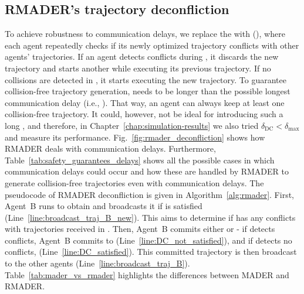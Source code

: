 \subsection{RMADER's trajectory deconfliction}

To achieve robustness to communication delays, we replace the \RecheckStep{} with \DelayCheckStep{} (\DCStep{}), where each agent repeatedly checks if its newly optimized trajectory conflicts with other agents' trajectories.
If an agent detects conflicts during \DCStep{}, it discards the new trajectory and starts another \OStep{} while executing its previous trajectory. 
If no collisions are detected in \DCStep{}, it starts executing the new trajectory. 
To guarantee collision-free trajectory generation, \DCStep{} needs to be longer than the possible longest communication delay (i.e., \NeccessaryCond{}). 
That way, an agent can always keep at least one collision-free trajectory. 
It could, however, not be ideal for introducing such a long \delayParameter{}, and therefore, in Chapter~\ref{chap:simulation-results} we also tried $\delta_{\text{DC}}<\delta_{\text{max}}$ and measure its performance. 
Fig.~\ref{fig:rmader_deconfliction} shows how RMADER deals with communication delays.
Furthermore, Table~\ref{tab:safety_guarantees_delays} shows all the possible cases in which communication delays could occur and how these are handled by RMADER to generate collision-free trajectories even with communication delays.
The pseudocode of RMADER deconfliction is given in Algorithm~\ref{alg:rmader}. First, Agent~B runs \OStep{} to obtain \trajBNew{} and broadcasts it if \CStep{} is satisfied 
(Line~\ref{line:broadcast_traj_B_new}). This \CStep{} aims to determine if \trajBNew{} has any conflicts with trajectories received in \OStep{}. Then, Agent~B commits either \trajBPrev{} or \trajBNew{} - if \DCStep{} detects conflicts, Agent~B commits to \trajBPrev{} (Line~\ref{line:DC_not_satisfied}), and if \DCStep{} detects no conflicts, \trajBNew{} (Line~\ref{line:DC_satisfied}). This committed trajectory is then broadcast to the other agents (Line~\ref{line:broadcast_traj_B}). Table~\ref{tab:mader_vs_rmader} highlights the differences between MADER and RMADER.

